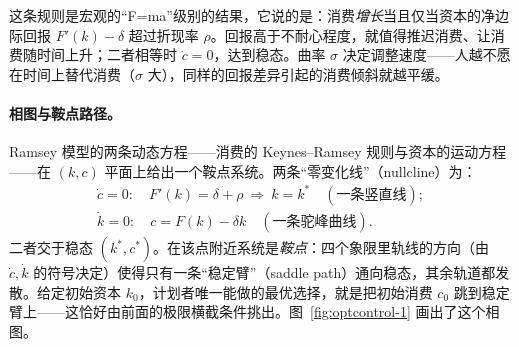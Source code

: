 这条规则是宏观的``F=ma''级别的结果，它说的是：消费\emph{增长}当且仅当资本的净边际回报 $F'(k)-\delta$ 超过折现率 $\rho$。回报高于不耐心程度，就值得推迟消费、让消费随时间上升；二者相等时 $\dot c=0$，达到稳态。曲率 $\sigma$ 决定调整速度——人越不愿在时间上替代消费（$\sigma$ 大），同样的回报差异引起的消费倾斜就越平缓。


\paragraph{相图与鞍点路径。}
Ramsey 模型的两条动态方程——消费的 Keynes--Ramsey 规则与资本的运动方程——在 $(k,c)$ 平面上给出一个鞍点系统。两条``零变化线''（nullcline）为：
\[
    \begin{gathered}
    \dot c=0:\quad F'(k)=\delta+\rho\ \Rightarrow\ k=k^*\quad(\text{一条竖直线});\\[3pt]
    \dot k=0:\quad c=F(k)-\delta k\quad(\text{一条驼峰曲线}).
    \end{gathered}
\]
二者交于稳态 $(k^*,c^*)$。在该点附近系统是\emph{鞍点}：四个象限里轨线的方向（由 $\dot c,\dot k$ 的符号决定）使得只有一条``稳定臂''（saddle path）通向稳态，其余轨道都发散。给定初始资本 $k_0$，计划者唯一能做的最优选择，就是把初始消费 $c_0$ 跳到稳定臂上——这恰好由前面的极限横截条件挑出。图~\ref{fig:optcontrol-1} 画出了这个相图。

